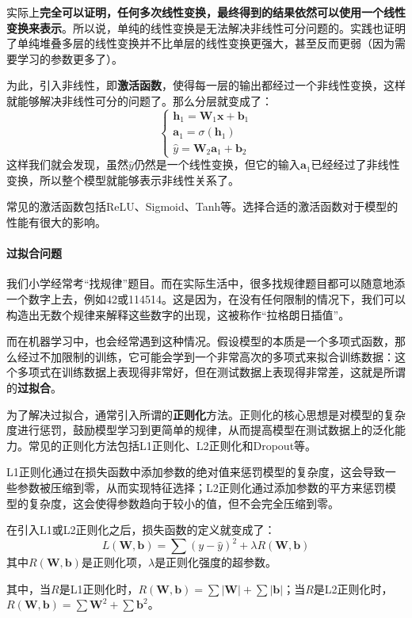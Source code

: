 \documentclass[fontset=none]{ctexart}
\begin{document}
实际上\textbf{完全可以证明，任何多次线性变换，最终得到的结果依然可以使用一个线性变换来表示}。所以说，单纯的线性变换是无法解决非线性可分问题的。实践也证明了单纯堆叠多层的线性变换并不比单层的线性变换更强大，甚至反而更弱（因为需要学习的参数更多了）。

为此，引入非线性，即\textbf{激活函数}，使得每一层的输出都经过一个非线性变换，这样就能够解决非线性可分的问题了。那么分层就变成了：
\[
    \begin{cases}
        \mathbf{h}_1 = \mathbf{W}_1\mathbf{x} + \mathbf{b}_1 \\
        \mathbf{a}_1 = \sigma(\mathbf{h}_1) \\
        \hat{y} = \mathbf{W}_2\mathbf{a}_1 + \mathbf{b}_2
\end{cases}\]
这样我们就会发现，虽然$\hat{y}$仍然是一个线性变换，但它的输入$\mathbf{a}_1$已经经过了非线性变换，所以整个模型就能够表示非线性关系了。

常见的激活函数包括ReLU、Sigmoid、Tanh等。选择合适的激活函数对于模型的性能有很大的影响。

\paragraph{过拟合问题}

我们小学经常考“找规律”题目。而在实际生活中，很多找规律题目都可以随意地添一个数字上去，例如42或114514。这是因为，在没有任何限制的情况下，我们可以构造出无数个规律来解释这些数字的出现，这被称作“拉格朗日插值”。

而在机器学习中，也会经常遇到这种情况。假设模型的本质是一个多项式函数，那么经过不加限制的训练，它可能会学到一个非常高次的多项式来拟合训练数据：这个多项式在训练数据上表现得非常好，但在测试数据上表现得非常差，这就是所谓的\textbf{过拟合}。

为了解决过拟合，通常引入所谓的\textbf{正则化}方法。正则化的核心思想是对模型的复杂度进行惩罚，鼓励模型学习到更简单的规律，从而提高模型在测试数据上的泛化能力。常见的正则化方法包括L1正则化、L2正则化和Dropout等。

L1正则化通过在损失函数中添加参数的绝对值来惩罚模型的复杂度，这会导致一些参数被压缩到零，从而实现特征选择；L2正则化通过添加参数的平方来惩罚模型的复杂度，这会使得参数趋向于较小的值，但不会完全压缩到零。

在引入L1或L2正则化之后，损失函数的定义就变成了：
\[L(\mathbf{W}, \mathbf{b}) = \sum (y - \hat{y})^2 + \lambda R(\mathbf{W}, \mathbf{b})\]
其中$R(\mathbf{W}, \mathbf{b})$是正则化项，$\lambda$是正则化强度的超参数。

其中，当$R$是L1正则化时，$R(\mathbf{W}, \mathbf{b}) = \sum |\mathbf{W}| + \sum |\mathbf{b}|$；当$R$是L2正则化时，$R(\mathbf{W}, \mathbf{b}) = \sum \mathbf{W}^2 + \sum \mathbf{b}^2$。
\end{document}

